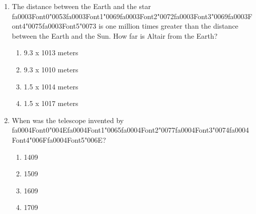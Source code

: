 \documentclass[12pt]{article}
\begin{document}
\begin{enumerate}[label=\arabic*.]
Moon?
\begin{enumerate}[label=(\alph*)]
    \item The Moon split from the Earth due to tidal forces.
    \item The Moon was captured into Earth orbit.
    \item The Earth and Moon co-accreted in the solar nebula.
    \item Earth was rotating so rapidly that the Moon split from it.
\end{enumerate}
\item The distance between the Earth and the star {\csname fa0003Font0\endcsname\char"0053}{\csname fa0003Font1\endcsname\char"0069}{\csname fa0003Font2\endcsname\char"0072}{\csname fa0003Font3\endcsname\char"0069}{\csname fa0003Font4\endcsname\char"0075}{\csname fa0003Font5\endcsname\char"0073} is one million times greater than the
distance between the Earth and the Sun. How far is Altair from the Earth?
\begin{enumerate}[label=(\alph*)]
    \item 9.3 x 1013 meters
    \item 9.3 x 1010 meters
    \item 1.5 x 1014 meters
    \item 1.5 x 1017 meters
\end{enumerate}
\item When was the telescope invented by {\csname fa0004Font0\endcsname\char"004E}{\csname fa0004Font1\endcsname\char"0065}{\csname fa0004Font2\endcsname\char"0077}{\csname fa0004Font3\endcsname\char"0074}{\csname fa0004Font4\endcsname\char"006F}{\csname fa0004Font5\endcsname\char"006E}?
\begin{enumerate}[label=(\alph*)]
    \item 1409
    \item 1509
    \item 1609
    \item 1709
\end{enumerate}
\end{enumerate}
\end{document}
